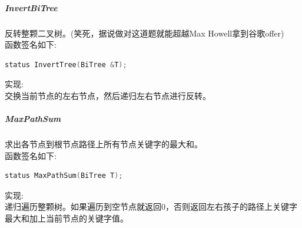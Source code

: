 \documentclass[supercite]{Experimental_Report}
\theoremstyle{definition}
\begin{document}
\subparagraph{InvertBiTree}
\noindent
反转整颗二叉树。(笑死，据说做对这道题就能超越Max Howell拿到谷歌offer) \\
函数签名如下:
\begin{lstlisting}[language=C++, frame=single]
status InvertTree(BiTree &T);
\end{lstlisting}
实现: \\
交换当前节点的左右节点，然后递归左右节点进行反转。 \\

\subparagraph{MaxPathSum}
\noindent
求出各节点到根节点路径上所有节点关键字的最大和。 \\
函数签名如下:
\begin{lstlisting}[language=C++, frame=single]
status MaxPathSum(BiTree T);
\end{lstlisting}
实现: \\
递归遍历整颗树。如果遍历到空节点就返回0，否则返回左右孩子的路径上关键字最大和加上当前节点的关键字值。 \\
\end{document}
